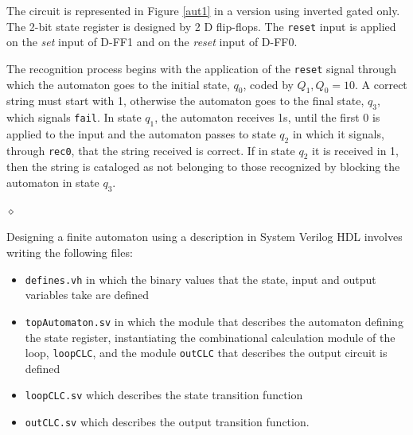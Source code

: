 \begin{exemplu}
The circuit is represented in Figure \ref{aut1} in a version using inverted gated
only. The 2-bit state register is designed by 2 D flip-flops. The
{\tt reset}  input is applied on the {\em set} input of D-FF1 and
on the {\em reset} input of D-FF0.

The recognition process begins with the application of the {\tt reset} signal through which the automaton goes to the initial state, $q_0$, coded by $Q_1, Q_0 = 10$. A correct string must start with 1, otherwise the automaton goes to the final state, $q_3$, which signals {\tt fail}. In state $q_1$, the automaton receives 1s, until the first 0 is applied to the input and the automaton passes to state $q_2$ in which it signals, through {\tt rec0}, that the string received is correct. If in state $q_2$ it is received in 1, then the string is cataloged as not belonging to those recognized by blocking the automaton in state $q_3$.

$\diamond$
\end{exemplu}

Designing a finite automaton using a description in System Verilog HDL involves writing the following files:
\begin{itemize}
\item {\tt defines.vh} in which the binary values that the state, input and output variables take are defined
\item {\tt topAutomaton.sv} in which the module that describes the automaton defining the state register, instantiating the combinational calculation module of the loop, {\tt loopCLC}, and the module {\tt outCLC} that describes the output circuit is defined
\item {\tt loopCLC.sv} which describes the state transition function
\item {\tt outCLC.sv} which describes the output transition function.
\end{itemize}


